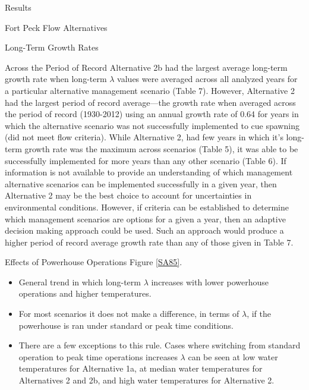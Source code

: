 \documentclass[12pt]{article}
\begin{document}
\begin{section}{Results}
\begin{subsection}{Fort Peck Flow Alternatives}
\begin{subsubsection}{Long-Term Growth Rates}
\begin{paragraph}{Across the Period of Record}
Alternative 2b had the largest average long-term growth rate when long-term $\lambda$ values were averaged across all analyzed years for a particular alternative management scenario (Table 7).  However, Alternative 2 had the largest period of record average---the  growth rate when averaged across the period of record (1930-2012) using an annual growth rate of 0.64 for years in which the alternative scenario was not successfully implemented to cue spawning (did not meet flow criteria).  While Alternative 2, had few years in which it's long-term growth rate was the maximum across scenarios (Table 5), it was able to be successfully implemented for more years than any other scenario (Table 6).  If information is not available to provide an understanding of which management alternative scenarios can be implemented successfully in a given year, then Alternative 2 may be the best choice to account for uncertainties in environmental conditions.  However, if criteria can be established to determine which management scenarios are options for a given a year, then an adaptive decision making approach could be used.  Such an approach would produce a higher period of record average growth rate than any of those given in Table 7.  %
\end{paragraph}
\begin{paragraph}{Effects of Powerhouse Operations}
Figure \ref{SA85}.
\begin{itemize}
\item General trend in which long-term $\lambda$ increases with lower powerhouse operations and higher temperatures.
\item For most scenarios it does not make a difference, in terms of $\lambda$, if the powerhouse is ran under standard or peak time conditions.
\item There are a few exceptions to this rule.  Cases where switching from standard operation to peak time operations increases $\lambda$ can be seen at low water temperatures for Alternative 1a, at median water temperatures for Alternatives 2 and 2b, and high water temperatures for Alternative 2.

\end{itemize}
\end{paragraph}
\end{subsubsection}
\end{subsection}
\end{section}
\end{document}
